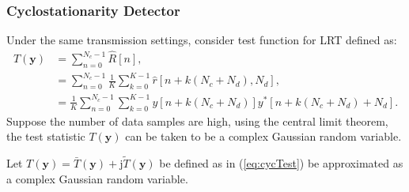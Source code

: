 \documentclass[11pt]{article}
\newcommand{\by}{\mathbf{y}}
\newcommand{\jj}{\mathrm{j}}
\begin{document}

\subsubsection*{Cyclostationarity Detector}
\label{subsubsec:cyclostationarityDetector}

Under the same transmission settings, consider test function for LRT defined as:
\begin{equation}
\begin{split}
	T(\by) &= \sum_{n=0}^{N_{c}-1} \hat{R}[n], \\
	&= \sum_{n=0}^{N_{c}-1} \frac{1}{K} \sum_{k=0}^{K-1} \hat{r}[n+k(N_{c}+N_{d}), N_{d}], \\
	&= \frac{1}{K} \sum_{n=0}^{N_{c}-1}\sum_{k=0}^{K-1} y[n+k(N_{c}+N_{d})] y^{*}[n+k(N_{c}+N_{d})+N_{d}].
\end{split}
\label{eq:cycTest}
\end{equation}
Suppose the number of data samples are high, using the central limit theorem, the test statistic $T(\by)$ can be taken to be a complex Gaussian random variable.

\noindent {} Let $T(\by) = \bar{T}(\by) + \jj \tilde{T}(\by)$ be defined as in (\ref{eq:cycTest}) be approximated as a complex Gaussian random variable.
\end{document}

